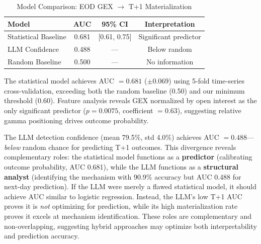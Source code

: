 \begin{table}[!htbp]
\centering
\caption{Model Comparison: EOD GEX $\rightarrow$ T+1 Materialization}
\label{tab:eod}
\small
\begin{tabular}{@{}lccc@{}}
\toprule
\textbf{Model} & \textbf{AUC} & \textbf{95\% CI} & \textbf{Interpretation} \\
\midrule
Statistical Baseline & 0.681 & [0.61, 0.75] & Significant predictor \\
LLM Confidence & 0.488 & --- & Below random \\
Random Baseline & 0.500 & --- & No information \\
\bottomrule
\end{tabular}
\end{table}

The statistical model achieves AUC $= 0.681$ ($\pm 0.069$) using 5-fold time-series cross-validation, exceeding both the random baseline (0.50) and our minimum threshold (0.60). Feature analysis reveals GEX normalized by open interest as the only significant predictor ($p = 0.0075$, coefficient $= 0.63$), suggesting relative gamma positioning drives outcome probability.

The LLM detection confidence (mean 79.5\%, std 4.0\%) achieves AUC $= 0.488$---\textit{below} random chance for predicting T+1 outcomes. This divergence reveals complementary roles: the statistical model functions as a \textbf{predictor} (calibrating outcome probability, AUC 0.681), while the LLM functions as a \textbf{structural analyst} (identifying the mechanism with 90.9\% accuracy but AUC 0.488 for next-day prediction). If the LLM were merely a flawed statistical model, it should achieve AUC similar to logistic regression. Instead, the LLM's low T+1 AUC proves it is \textit{not} optimizing for prediction, while its high materialization rate proves it excels at mechanism identification. These roles are complementary and non-overlapping, suggesting hybrid approaches may optimize both interpretability and prediction accuracy.
